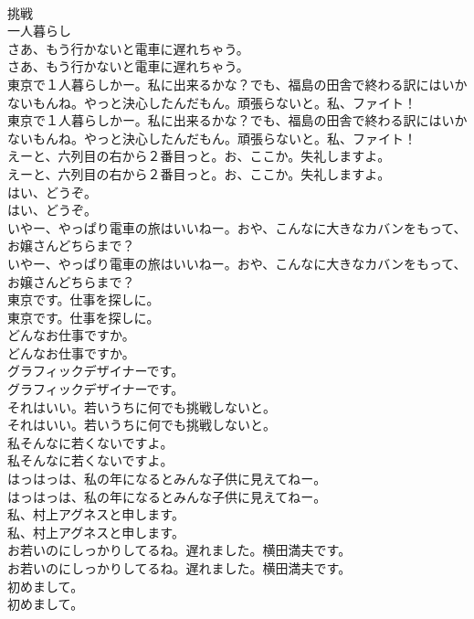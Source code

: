 \documentclass[8pt]{extreport}
\begin{document}
\begin{CJK}{UTF8}{min}
\\	挑戦
\\	一人暮らし
\\	さあ、もう行かないと電車に遅れちゃう。	
\\	さあ、もう行かないと電車に遅れちゃう。 
\\	東京で１人暮らしかー。私に出来るかな？でも、福島の田舎で終わる訳にはいかないもんね。やっと決心したんだもん。頑張らないと。私、ファイト！	
\\	東京で１人暮らしかー。私に出来るかな？でも、福島の田舎で終わる訳にはいかないもんね。やっと決心したんだもん。頑張らないと。私、ファイト！ 
\\	えーと、六列目の右から２番目っと。お、ここか。失礼しますよ。	
\\	えーと、六列目の右から２番目っと。お、ここか。失礼しますよ。 
\\	はい、どうぞ。	
\\	はい、どうぞ。 
\\	いやー、やっぱり電車の旅はいいねー。おや、こんなに大きなカバンをもって、お嬢さんどちらまで？	
\\	いやー、やっぱり電車の旅はいいねー。おや、こんなに大きなカバンをもって、お嬢さんどちらまで？ 
\\	東京です。仕事を探しに。	
\\	東京です。仕事を探しに。 
\\	どんなお仕事ですか。	
\\	どんなお仕事ですか。 
\\	グラフィックデザイナーです。	
\\	グラフィックデザイナーです。 
\\	それはいい。若いうちに何でも挑戦しないと。	
\\	それはいい。若いうちに何でも挑戦しないと。 
\\	私そんなに若くないですよ。	
\\	私そんなに若くないですよ。 
\\	はっはっは、私の年になるとみんな子供に見えてねー。	
\\	はっはっは、私の年になるとみんな子供に見えてねー。 
\\	私、村上アグネスと申します。	
\\	私、村上アグネスと申します。 
\\	お若いのにしっかりしてるね。遅れました。横田満夫です。	
\\	お若いのにしっかりしてるね。遅れました。横田満夫です。 
\\	初めまして。	
\\	初めまして。 

\end{CJK}
\end{document}
